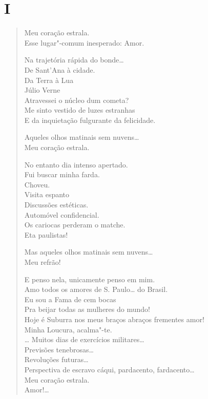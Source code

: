 \chapter[I -- ``Meu coração estrala.'']{I}

\begin{verse}
Meu coração estrala.\\
Esse lugar"-comum inesperado: Amor.

\quad\quad\quad{}Na trajetória rápida do bonde\ldots{}\\
\quad\quad\quad\quad{}De Sant'Ana à cidade.\\
\quad\quad\quad\quad\quad{}Da Terra à Lua\\
\quad\quad\quad\quad\quad\quad{}Júlio Verne\\
\quad\quad\quad\quad\quad{}Atravessei o núcleo dum cometa?\\
\quad\quad\quad\quad{}Me sinto vestido de luzes estranhas\\
\quad\quad\quad\quad{}E da inquietação fulgurante da felicidade.

Aqueles olhos matinais sem nuvens\ldots{}\\
Meu coração estrala.

No entanto dia intenso apertado.\\
\quad\quad\quad\quad{}Fui buscar minha farda.\\
\quad\quad\quad\quad{}Choveu.\\
\quad\quad\quad\quad{}Visita espanto\\
\quad\quad\quad\quad{}Discussões estéticas.\\
\quad\quad\quad\quad{}Automóvel confidencial.\\
\quad\quad\quad\quad{}Os cariocas perderam o matche.\\
\quad\quad\quad\quad{}Eta paulistas!

Mas aqueles olhos matinais sem nuvens\ldots{}\\
Meu refrão!

E penso nela, unicamente penso em mim.\\
Amo todos os amores de S. Paulo\ldots{} do Brasil.\\
Eu sou a Fama de cem bocas\\
Pra beijar todas as mulheres do mundo!\\
Hoje é Suburra nos meus braços abraços frementes amor!\\
Minha Loucura, acalma"-te.\\
\ldots{} Muitos dias de exercícios militares\ldots{}\\
\quad\quad\quad\quad{}Previsões tenebrosas\ldots{}\\
\quad\quad\quad\quad\quad\quad{}Revoluções futuras\ldots{}\\
Perspectiva de escravo cáqui, pardacento, fardacento\ldots{}\\

Meu coração estrala.\\
Amor!\ldots{}
\end{verse}

